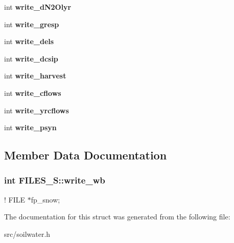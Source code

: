 \begin{DoxyCompactItemize}
\item 
\hypertarget{struct_f_i_l_e_s___s_a89cf58ff17b5a8cf707adf923fb6bd06}{int {\bfseries write\-\_\-d\-N2\-Olyr}}\label{struct_f_i_l_e_s___s_a89cf58ff17b5a8cf707adf923fb6bd06}

\item 
\hypertarget{struct_f_i_l_e_s___s_ad807c0b1e5820be41428d0c23ba20a01}{int {\bfseries write\-\_\-gresp}}\label{struct_f_i_l_e_s___s_ad807c0b1e5820be41428d0c23ba20a01}

\item 
\hypertarget{struct_f_i_l_e_s___s_afdd427ced5993624aa9ca8fe8c2d63ec}{int {\bfseries write\-\_\-dels}}\label{struct_f_i_l_e_s___s_afdd427ced5993624aa9ca8fe8c2d63ec}

\item 
\hypertarget{struct_f_i_l_e_s___s_acc2d75ef43ebed73ef58ee28ec142ba8}{int {\bfseries write\-\_\-dcsip}}\label{struct_f_i_l_e_s___s_acc2d75ef43ebed73ef58ee28ec142ba8}

\item 
\hypertarget{struct_f_i_l_e_s___s_a41239828cfca03fc9b3c0a4be9c9fd31}{int {\bfseries write\-\_\-harvest}}\label{struct_f_i_l_e_s___s_a41239828cfca03fc9b3c0a4be9c9fd31}

\item 
\hypertarget{struct_f_i_l_e_s___s_a52dfb5afff6de00a159287e4e15b89f5}{int {\bfseries write\-\_\-cflows}}\label{struct_f_i_l_e_s___s_a52dfb5afff6de00a159287e4e15b89f5}

\item 
\hypertarget{struct_f_i_l_e_s___s_a5e3b00579e4f4cc32bce4fdc65317b9c}{int {\bfseries write\-\_\-yrcflows}}\label{struct_f_i_l_e_s___s_a5e3b00579e4f4cc32bce4fdc65317b9c}

\item 
\hypertarget{struct_f_i_l_e_s___s_aa3a4dc55707457a303b202bb9df5676a}{int {\bfseries write\-\_\-psyn}}\label{struct_f_i_l_e_s___s_aa3a4dc55707457a303b202bb9df5676a}

\end{DoxyCompactItemize}


\subsection{Member Data Documentation}
\hypertarget{struct_f_i_l_e_s___s_aeefdf7ba0058773018f327d8b4478f03}{
\subsubsection[{write\-\_\-wb}]{\setlength{\rightskip}{0pt plus 5cm}int F\-I\-L\-E\-S\-\_\-\-S\-::write\-\_\-wb}}\label{struct_f_i_l_e_s___s_aeefdf7ba0058773018f327d8b4478f03}
! F\-I\-L\-E $\ast$fp\-\_\-snow; 

The documentation for this struct was generated from the following file\-:\begin{DoxyCompactItemize}
\item 
src/soilwater.\-h\end{DoxyCompactItemize}
